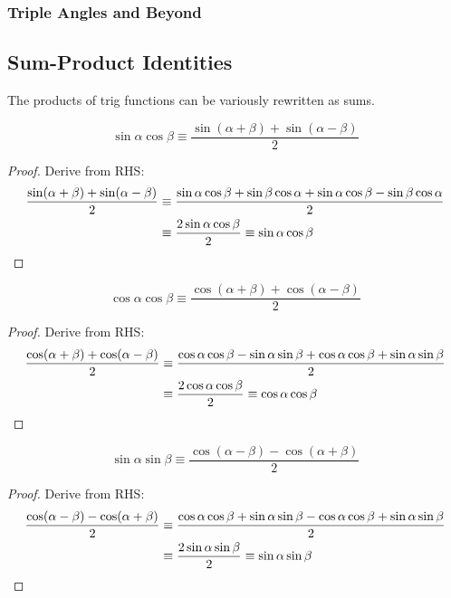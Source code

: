 \subsubsection{Triple Angles and Beyond}

\subsection{Sum-Product Identities} \label{sec_trig_sum_product}

The products of trig functions can be variously rewritten as sums.

\begin{theorem}
\begin{equation*}
\sin \alpha \cos \beta \equiv
    \frac{\sin(\alpha + \beta) + \sin(\alpha - \beta)} 2
\end{equation*}
\end{theorem}
\begin{proof}
Derive from RHS:
\begin{align*}
\frac{\sin(\alpha + \beta) + \sin(\alpha - \beta)} 2 &\equiv
 \frac{\sin \alpha \cos \beta + \sin \beta \cos \alpha +
       \sin \alpha \cos \beta - \sin \beta \cos \alpha} 2 \\
&\equiv \frac{2 \sin \alpha \cos \beta} 2 \equiv \sin \alpha \cos \beta
    \qedhere
\end{align*}
\end{proof}
\begin{theorem}
\begin{equation*}
\cos \alpha \cos \beta \equiv
 \frac{\cos(\alpha + \beta) + \cos(\alpha - \beta)} 2
\end{equation*}
\end{theorem}
\begin{proof}
Derive from RHS:
\begin{align*}
\frac{\cos(\alpha + \beta) + \cos(\alpha - \beta)} 2 &\equiv
 \frac{\cos \alpha \cos \beta - \sin \alpha \sin \beta +
       \cos \alpha \cos \beta + \sin \alpha \sin \beta} 2 \\
&\equiv \frac{2 \cos \alpha \cos \beta} 2 \equiv \cos \alpha \cos \beta
    \qedhere
\end{align*}
\end{proof}
\begin{theorem}
\begin{equation*}
\sin \alpha \sin \beta \equiv
 \frac{\cos(\alpha - \beta) - \cos(\alpha + \beta)} 2
\end{equation*}
\end{theorem}
\begin{proof}
Derive from RHS:
\begin{align*}
\frac{\cos(\alpha - \beta) - \cos(\alpha + \beta)} 2 &\equiv
 \frac{\cos \alpha \cos \beta + \sin \alpha \sin \beta -
       \cos \alpha \cos \beta + \sin \alpha \sin \beta} 2 \\
&\equiv \frac{2 \sin \alpha \sin \beta} 2 \equiv \sin \alpha \sin \beta
    \qedhere
\end{align*}
\end{proof}

